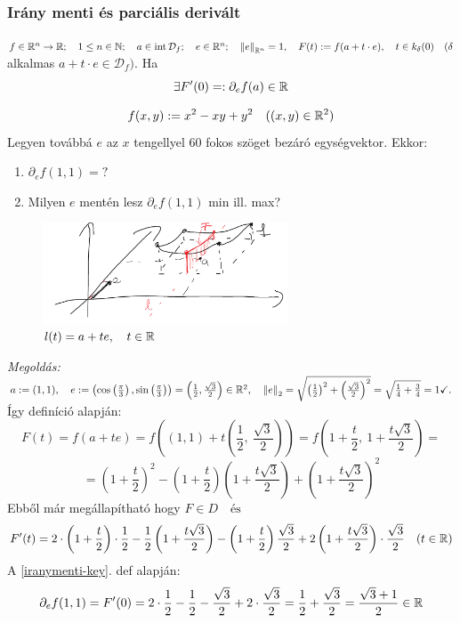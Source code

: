 \documentclass[a4paper,11.5pt]{article}
\DeclareMathOperator{\Int}{int}
\newcommand{\norm}[1]{\left\lVert#1\right\rVert}
\begin{document}
	\subsubsection{Irány menti és parciális derivált}
	\begin{revision}\label{iranymenti-key}
			$f\in\R{^n}\to\R;\quad 1\leq n\in\N;\quad a\in\Int\mathcal{D}_f;\quad e\in\R^n;\quad \norm{e}_{\R^n}=1, \quad F(t):=f(a+t\cdot e),\quad t\in k_\delta(0)\quad (\delta$ alkalmas $a+t\cdot e\in\mathcal{D}_f).$ Ha
			\[ \exists F'(0)=:\partial_ef(a)\in\mathbb{R} \]
	\end{revision}
	\begin{task}
		\[ f(x,y):=x^2-xy+y^2\quad ((x,y)\in\mathbb{R}^2) \]
		Legyen továbbá $e$ az $x$ tengellyel 60 fokos szöget bezáró egységvektor.
		Ekkor:
		\begin{enumerate}
			\item $\partial_{e}f(1,1)=?$
			\item Milyen $e$ mentén lesz $\partial_{e}f(1,1)$ min ill. max?
		\end{enumerate}
		\begin{figure}[H]
			\centering
			\includegraphics[height=3cm]{../2zh/kepek/30.png}
			\caption{$l(t)=a+te,\quad  t\in\mathbb{R}$}
		\end{figure}
		\textit{Megoldás:} $a:=(1,1),\quad  e:=\left(\cos\left(\frac{\pi}{3}\right),\sin\left(\frac{\pi}{3}\right)\right)=\left(\frac{1}{2},\frac{\sqrt{3}}{2}\right)\in\R^2,\quad \norm{e}_2=\sqrt{\left(\frac{1}{2}\right)^2+\left(\frac{\sqrt{3}}{2}\right)^2}=\sqrt{\frac{1}{4}+\frac{3}{4}}=1\checkmark.$ Így definíció alapján:
		\[ F(t)=f(a+te)=f\left((1,1)+t\left(\frac{1}{2},\ \frac{\sqrt{3}}{2}\right)\right)=f\left(1+\frac{t}{2},\ 1+\frac{t\sqrt{3}}{2}\right)=\]
		\[=\left(1+\frac{t}{2}\right)^2-\left(1+\frac{t}{2}\right)\left(1+\frac{t\sqrt{3}}{2}\right)+\left(1+\frac{t\sqrt{3}}{2}\right)^2\]
		Ebből már megállapítható hogy $ F\in D\quad \text{és}$
		\[ F'(t)=2\cdot\left(1+\frac{t}{2}\right)\cdot\frac{1}{2}-\frac{1}{2}\left(1+\frac{t\sqrt{3}}{2}\right)-\left(1+\frac{t}{2}\right)\frac{\sqrt{3}}{2}+2\left(1+\frac{t\sqrt{3}}{2}\right)\cdot\frac{\sqrt{3}}{2}\quad (t\in\mathbb{R}) \]
		A \ref{iranymenti-key}. def alapján:
		\[ \partial_ef(1,1)=F'(0)=2\cdot\frac{1}{2}-\frac{1}{2}-\frac{\sqrt{3}}{2}+2\cdot\frac{\sqrt{3}}{2}=\frac{1}{2}+\frac{\sqrt{3}}{2}=\frac{\sqrt{3}+1}{2}\in\mathbb{R} \]
		
	\end{task}
\end{document}
